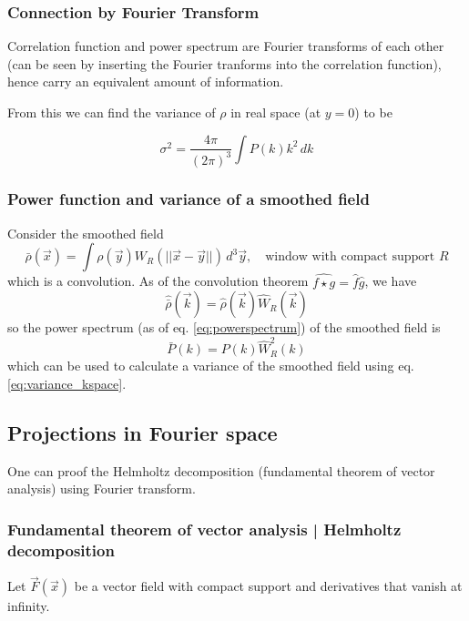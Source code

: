 \subsubsection{Connection by Fourier Transform}
Correlation function and power spectrum are Fourier transforms of each
other (can be seen by inserting the Fourier tranforms into the
correlation function), hence carry an equivalent amount of information.

From this we can find the variance of $\rho$ in real space (at $y = 0$) to be

\begin{equation}
    \label{eq:variance_kspace}
    \sigma^2 = \frac{4\pi}{(2 \pi)^3} \int P(k) k^2 \, dk
\end{equation}

\subsubsection{Power function and variance of a smoothed field}
Consider the smoothed field
\begin{equation}
    \bar{\rho}(\vec{x}) = \int \rho(\vec{y}) W_R(||\vec{x}-\vec{y}||) \, d^3 \vec{y}, \quad \text{window with compact support } R
\end{equation}
which is a convolution. As of the convolution theorem $\widehat{f \star g} = \hat{f} \hat{g}$, we have
\begin{equation}
    \hat{\bar{\rho}}(\vec{k}) = \hat{\rho}(\vec{k}) \hat{W}_R(\vec{k})
\end{equation}
so the power spectrum (as of eq. \ref{eq:powerspectrum}) of the smoothed field is
\begin{equation}
    \bar{P}(k) = P(k) \hat{W}_R^2(k)
\end{equation}
which can be used to calculate a variance of the smoothed field using eq. \ref{eq:variance_kspace}.

\subsection{Projections in Fourier space}
One can proof the Helmholtz decomposition (fundamental theorem of vector analysis) using Fourier transform.

\subsubsection{Fundamental theorem of vector analysis | Helmholtz decomposition}
Let $\vec{F}(\vec{x})$ be a vector field with compact support and derivatives that vanish at infinity.

